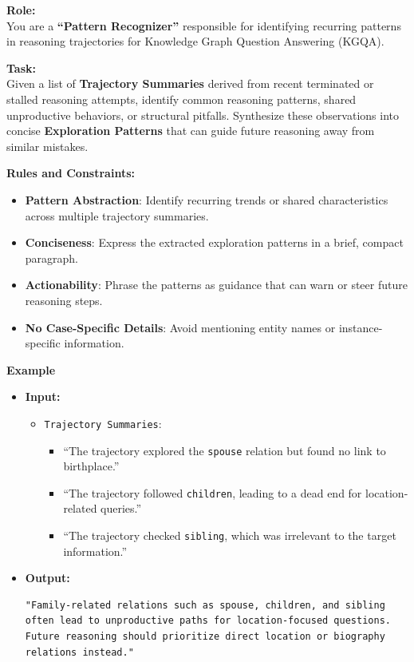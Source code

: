 \begin{tcolorbox}[title=Prompt Template for Exploration Pattern Extraction, colback=white, colframe=black!75, boxrule=0.5pt, arc=2mm]

\textbf{Role:} \\
You are a \textbf{“Pattern Recognizer”} responsible for identifying recurring patterns in reasoning trajectories for Knowledge Graph Question Answering (KGQA).

\textbf{Task:} \\
Given a list of \textbf{Trajectory Summaries} derived from recent terminated or stalled reasoning attempts, identify common reasoning patterns, shared unproductive behaviors, or structural pitfalls. Synthesize these observations into concise \textbf{Exploration Patterns} that can guide future reasoning away from similar mistakes.

\textbf{Rules and Constraints:}
\begin{itemize}[leftmargin=1.5em, itemsep=0pt, topsep=0pt]
    \item \textbf{Pattern Abstraction}: Identify recurring trends or shared characteristics across multiple trajectory summaries.
    \item \textbf{Conciseness}: Express the extracted exploration patterns in a brief, compact paragraph.
    \item \textbf{Actionability}: Phrase the patterns as guidance that can warn or steer future reasoning steps.
    \item \textbf{No Case-Specific Details}: Avoid mentioning entity names or instance-specific information.
\end{itemize}

\textbf{Example}
\begin{itemize}[leftmargin=1.5em, itemsep=0pt, topsep=2pt]
    \item \textbf{Input:}
    \begin{itemize}
        \item \texttt{Trajectory Summaries}:
        \begin{itemize}
            \item ``The trajectory explored the \texttt{spouse} relation but found no link to birthplace.''
            \item ``The trajectory followed \texttt{children}, leading to a dead end for location-related queries.''
            \item ``The trajectory checked \texttt{sibling}, which was irrelevant to the target information.''
        \end{itemize}
    \end{itemize}
    \item \textbf{Output:}
\begin{verbatim}
"Family-related relations such as spouse, children, and sibling
often lead to unproductive paths for location-focused questions.
Future reasoning should prioritize direct location or biography
relations instead."
\end{verbatim}
\end{itemize}


\end{tcolorbox}
